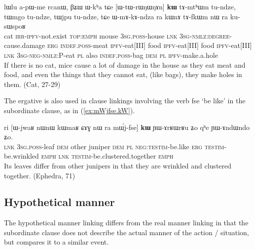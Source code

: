 \documentclass[oldfontcommands,oneside,a4paper,11pt]{article}
\newcommand{\ipa}[1]{{\phon \mbox{#1}}} %
\newcommand{\refb}[1]{(\ref{#1})}
\begin{document}
\begin{exe}
\ex \label{ex:WtWrWNWNAn}
\gll
\ipa{lɯlu}         	\ipa{a-pɯ-me}         	\ipa{rcanɯ,}         	\ipa{βʑɯ}         	\ipa{ɯ-kʰa}         	\ipa{tɕe}         	[\ipa{ɯ-tɯ-rɯŋɯŋɤn}]         	\ipa{\textbf{kɯ}}          \ipa{tɤ-mtʰɯm}         	\ipa{tu-ndze,}         	\ipa{tɯmgo}         	\ipa{tu-ndze,}         	\ipa{tɯjpu}         	\ipa{tu-ndze,}         \ipa{tɕe}         	\ipa{ɯ-mɤ-kɤ-ndza}         	\ipa{ra}         	\ipa{kɯnɤ}         	\ipa{tɤ-fkɯm}         	\ipa{nɯ} \ipa{ra}         	\ipa{ku-sɯspoʁ}         \\
cat \textsc{irr-ipfv}-not.exist \textsc{top:emph} mouse \textsc{3sg.poss}-house \textsc{lnk} \textsc{3sg-nmlz:degree}-cause.damage \textsc{erg} \textsc{indef.poss}-meat \textsc{ipfv}-eat[III] food \textsc{ipfv}-eat[III] food \textsc{ipfv}-eat[III]  \textsc{lnk} \textsc{3sg-neg-nmlz:P}-eat \textsc{pl} also \textsc{indef.poss}-bag \textsc{dem} \textsc{pl} \textsc{ipfv}-make.a.hole \\
\glt  If there is no cat, mice cause a lot of damage in the house as they eat meat and food, and even the things that they cannot eat, (like bags), they make holes in them. (Cat, 27-29)
\end{exe}
 
 
 The ergative is also used in clause linkings involving the verb \ipa{fse} `be like' in the subordinate clause, as in \refb{ex:mWjfse.kW}.
 
 \begin{exe}
\ex \label{ex:mWjfse.kW}
\gll
\ipa{ri} 	[\ipa{ɯ-jwaʁ} 	\ipa{nɯnɯ} 	\ipa{kɯmaʁ} 	\ipa{ɕɤɣ} 	\ipa{nɯ} \ipa{ra} 	\ipa{mɯ́j-fse}] 	\ipa{\textbf{kɯ}} 	\ipa{ɲɯ-ɤrʁɯrʁu} 	\ipa{ʑo} 	\ipa{qʰe} 	\ipa{ɲɯ-ɤndɯndo} 	\ipa{ʑo.} \\
\textsc{lnk} \textsc{3sg.poss}-leaf \textsc{dem} other juniper \textsc{dem} \textsc{pl} \textsc{neg:testim}-be.like \textsc{erg} \textsc{testim}-be.wrinkled \textsc{emph} \textsc{lnk}  \textsc{testim}-be.clustered.together \textsc{emph} \\
\glt Its leaves differ from other junipers in that they are wrinkled and clustered together. (Ephedra, 71)
 \end{exe}
 
\subsection{Hypothetical manner}
The hypothetical manner linking differs from the real manner linking in that the subordinate clause does not describe the actual manner of the action / situation, but compares it to a similar event. 
\end{document}

